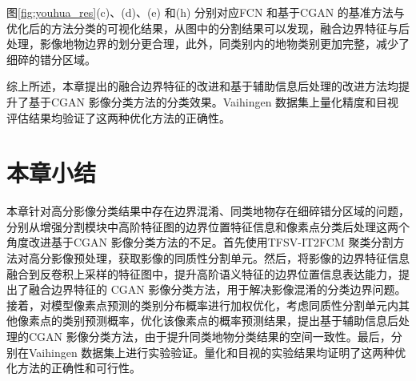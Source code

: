 图\ref{fig:youhua_res}(c)、(d)、(e) 和(h) 分别对应FCN 和基于CGAN 的基准方法与优化后的方法分类的可视化结果，从图中的分割结果可以发现，融合边界特征与后处理，影像地物边界的划分更合理，此外，同类别内的地物类别更加完整，减少了细碎的错分区域。

综上所述，本章提出的融合边界特征的改进和基于辅助信息后处理的改进方法均提升了基于CGAN 影像分类方法的分类效果。Vaihingen 数据集上量化精度和目视评估结果均验证了这两种优化方法的正确性。


\section{本章小结}
\label{sec::chap04-6}
本章针对高分影像分类结果中存在边界混淆、同类地物存在细碎错分区域的问题，分别从增强分割模块中高阶特征图的边界位置特征信息和像素点分类后处理这两个角度改进基于CGAN 影像分类方法的不足。首先使用TFSV-IT2FCM 聚类分割方法对高分影像预处理，获取影像的同质性分割单元。然后，将影像的边界特征信息融合到反卷积上采样的特征图中，提升高阶语义特征的边界位置信息表达能力，提出了融合边界特征的 CGAN 影像分类方法，用于解决影像混淆的分类边界问题。接着，对模型像素点预测的类别分布概率进行加权优化，考虑同质性分割单元内其他像素点的类别预测概率，优化该像素点的概率预测结果，提出基于辅助信息后处理的CGAN 影像分类方法，由于提升同类地物分类结果的空间一致性。最后，分别在Vaihingen 数据集上进行实验验证。量化和目视的实验结果均证明了这两种优化方法的正确性和可行性。
